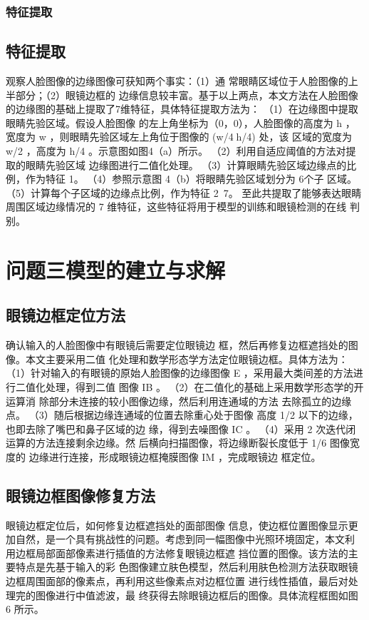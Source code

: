 \documentclass[12pt]{article}
\begin{document}
{        \subsubsection{特征提取}
      
       \subsection{特征提取}
       观察人脸图像的边缘图像可获知两个事实：（1）通
常眼睛区域位于人脸图像的上半部分；（2）眼镜边框的
边缘信息较丰富。基于以上两点，本文方法在人脸图像
的边缘图的基础上提取了7维特征，具体特征提取方法为：
（1）在边缘图中提取眼睛先验区域。假设人脸图像
的左上角坐标为（0，0），人脸图像的高度为 h ，宽度为
w ，则眼睛先验区域左上角位于图像的 (w/4h/4) 处，该
区域的宽度为 w/2 ，高度为 h/4 。示意图如图4（a）所示。
（2）利用自适应阈值的方法对提取的眼睛先验区域
边缘图进行二值化处理。
（3）计算眼睛先验区域边缘点的比例，作为特征 1。
（4）参照示意图 4（b）将眼睛先验区域划分为 6个子
区域。
（5）计算每个子区域的边缘点比例，作为特征 2~7。
至此共提取了能够表达眼睛周围区域边缘情况的 7
维特征，这些特征将用于模型的训练和眼镜检测的在线
判别。
       
    
       {\centering\section{问题三模型的建立与求解}}
      \subsection{眼镜边框定位方法}
         \par 确认输入的人脸图像中有眼镜后需要定位眼镜边
         框，然后再修复边框遮挡处的图像。本文主要采用二值
         化处理和数学形态学方法定位眼镜边框。具体方法为：
         （1）针对输入的有眼镜的原始人脸图像的边缘图像
         E ，采用最大类间差的方法进行二值化处理，得到二值
         图像 IB 。
         （2）在二值化的基础上采用数学形态学的开运算消
         除部分未连接的较小图像边缘，然后利用连通域的方法
         去除孤立的边缘点。
         （3）随后根据边缘连通域的位置去除重心处于图像
         高度 1/2 以下的边缘，也即去除了嘴巴和鼻子区域的边
         缘，得到去噪图像 IC 。
         （4）采用 2 次迭代闭运算的方法连接剩余边缘。然
         后横向扫描图像，将边缘断裂长度低于 1/6 图像宽度的
         边缘进行连接，形成眼镜边框掩膜图像 IM ，完成眼镜边
         框定位。
       \subsection{眼镜边框图像修复方法}
         \par 眼镜边框定位后，如何修复边框遮挡处的面部图像
         信息，使边框位置图像显示更加自然，是一个具有挑战性的问题。考虑到同一幅图像中光照环境固定，本文利
         用边框局部面部像素进行插值的方法修复眼镜边框遮
         挡位置的图像。该方法的主要特点是先基于输入的彩
         色图像建立肤色模型，然后利用肤色检测方法获取眼镜
         边框周围面部的像素点，再利用这些像素点对边框位置
         进行线性插值，最后对处理完的图像进行中值滤波，最
         终获得去除眼镜边框后的图像。具体流程框图如图 6
         所示。
}
\end{document}
